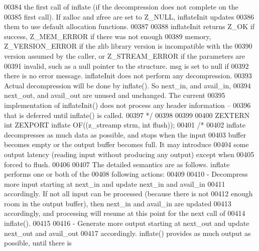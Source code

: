 \begin{DoxyCode}
00384 \textcolor{comment}{   the first call of inflate (if the decompression does not complete on the}
00385 \textcolor{comment}{   first call).  If zalloc and zfree are set to Z\_NULL, inflateInit updates}
00386 \textcolor{comment}{   them to use default allocation functions.}
00387 \textcolor{comment}{}
00388 \textcolor{comment}{     inflateInit returns Z\_OK if success, Z\_MEM\_ERROR if there was not enough}
00389 \textcolor{comment}{   memory, Z\_VERSION\_ERROR if the zlib library version is incompatible with the}
00390 \textcolor{comment}{   version assumed by the caller, or Z\_STREAM\_ERROR if the parameters are}
00391 \textcolor{comment}{   invalid, such as a null pointer to the structure.  msg is set to null if}
00392 \textcolor{comment}{   there is no error message.  inflateInit does not perform any decompression.}
00393 \textcolor{comment}{   Actual decompression will be done by inflate().  So next\_in, and avail\_in,}
00394 \textcolor{comment}{   next\_out, and avail\_out are unused and unchanged.  The current}
00395 \textcolor{comment}{   implementation of inflateInit() does not process any header information --}
00396 \textcolor{comment}{   that is deferred until inflate() is called.}
00397 \textcolor{comment}{*/}
00398 
00399 
00400 ZEXTERN \textcolor{keywordtype}{int} ZEXPORT inflate OF((z\_streamp strm, \textcolor{keywordtype}{int} flush));
00401 \textcolor{comment}{/*}
00402 \textcolor{comment}{    inflate decompresses as much data as possible, and stops when the input}
00403 \textcolor{comment}{  buffer becomes empty or the output buffer becomes full.  It may introduce}
00404 \textcolor{comment}{  some output latency (reading input without producing any output) except when}
00405 \textcolor{comment}{  forced to flush.}
00406 \textcolor{comment}{}
00407 \textcolor{comment}{  The detailed semantics are as follows.  inflate performs one or both of the}
00408 \textcolor{comment}{  following actions:}
00409 \textcolor{comment}{}
00410 \textcolor{comment}{  - Decompress more input starting at next\_in and update next\_in and avail\_in}
00411 \textcolor{comment}{    accordingly.  If not all input can be processed (because there is not}
00412 \textcolor{comment}{    enough room in the output buffer), then next\_in and avail\_in are updated}
00413 \textcolor{comment}{    accordingly, and processing will resume at this point for the next call of}
00414 \textcolor{comment}{    inflate().}
00415 \textcolor{comment}{}
00416 \textcolor{comment}{  - Generate more output starting at next\_out and update next\_out and avail\_out}
00417 \textcolor{comment}{    accordingly.  inflate() provides as much output as possible, until there is}

\end{DoxyCode}
